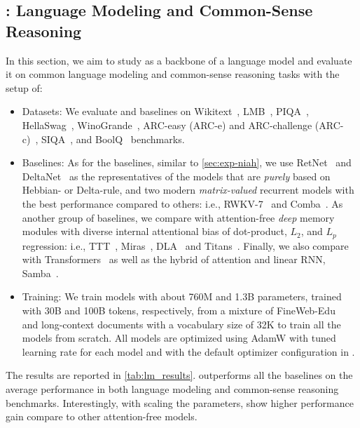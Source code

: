 \subsection{\model: Language Modeling and Common-Sense Reasoning}\label{sec:exp-lm}
In this section, we aim to study \model{} as a backbone of a language model and evaluate it on common language modeling and common-sense reasoning tasks with the setup of: 
\begin{itemize}
    \item Datasets: We evaluate \model{} and baselines on Wikitext~\citep{merity2017pointer}, LMB~\citep{paperno-etal-2016-lambada}, PIQA~\citep{bisk2020piqa}, HellaSwag~\citep{zellers-etal-2019-hellaswag}, WinoGrande~\citep{sakaguchi2021winogrande},  ARC-easy (ARC-e) and ARC-challenge (ARC-c)~\citep{clark2018think}, SIQA~\citep{sap-etal-2019-social}, and BoolQ~\citep{clark-etal-2019-boolq} benchmarks.
    \item {Baselines}: As for the baselines, similar to \autoref{sec:exp-niah}, we use RetNet~\citep{sun2023retentive} and DeltaNet~\citep{schlag2021linear} as the representatives of the models that are \emph{purely} based on Hebbian- or Delta-rule, and two modern \emph{matrix-valued} recurrent models with the best performance compared to others: i.e., RWKV-7~\citep{rwkv-repo} and Comba~\citep{hu2025improving}. As another group of baselines, we compare with attention-free \emph{deep} memory modules with diverse internal attentional bias of dot-product, $L_2$, and $L_p$ regression: i.e., TTT~\citep{sun2024learning}, Miras~\citep{behrouz2025Miras}, DLA~\citep{behrouz2025atlas} and Titans~\citep{behrouz2024titans}. Finally, we also compare with Transformers~\citep{transformers, dubey2024llama} as well as the hybrid of attention and linear RNN, Samba~\citep{ren2024samba}. 
    \item Training: We train models with about 760M and 1.3B parameters, trained with 30B and 100B tokens, respectively, from a mixture of FineWeb-Edu~\citep{penedo2024fineweb} and long-context documents with a vocabulary size of 32K to train all the models from scratch. All models are optimized using AdamW with tuned learning rate for each model and with the default optimizer configuration in \citet{behrouz2024titans}.
\end{itemize}
The results are reported in \autoref{tab:lm_results}. \model{} outperforms all the baselines on the average performance in both language modeling and common-sense reasoning benchmarks. Interestingly, with scaling the parameters, \model{} show higher performance gain compare to other attention-free models. 








